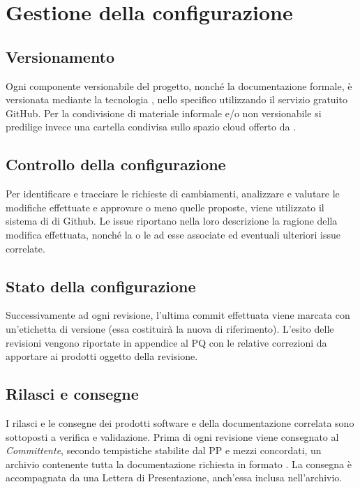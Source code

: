 \documentclass[../NormediProgetto.tex]{subfiles}
\begin{document}
\section{Gestione della configurazione}

\subsection{Versionamento} 
Ogni componente versionabile del progetto, nonché la documentazione formale, è versionata mediante la tecnologia , nello specifico utilizzando il servizio gratuito GitHub.
Per la condivisione di materiale informale e/o non versionabile si predilige invece una cartella condivisa sullo spazio cloud offerto da .

\subsection{Controllo della configurazione}

Per identificare e tracciare le richieste di cambiamenti, analizzare e valutare le modifiche effettuate e approvare o meno quelle proposte, viene utilizzato il sistema di  di Github. Le issue riportano nella loro descrizione la ragione della modifica effettuata, nonché la o le  ad esse associate ed eventuali ulteriori issue correlate. 

\subsection{Stato della configurazione}

Successivamente ad ogni revisione, l'ultima commit effettuata viene marcata con un'etichetta di versione (essa costituirà la nuova  di riferimento). L'esito delle revisioni vengono riportate in appendice al PQ con le relative correzioni da apportare ai prodotti oggetto della revisione.

\subsection{Rilasci e consegne}

I rilasci e le consegne dei prodotti software e della documentazione correlata sono sottoposti a verifica e validazione. Prima di ogni revisione viene consegnato al \textit{Committente}, secondo tempistiche stabilite dal PP e mezzi concordati, un archivio contenente tutta la documentazione richiesta in formato . La consegna è accompagnata da una Lettera di
Presentazione, anch'essa inclusa nell'archivio.
\end{document}
